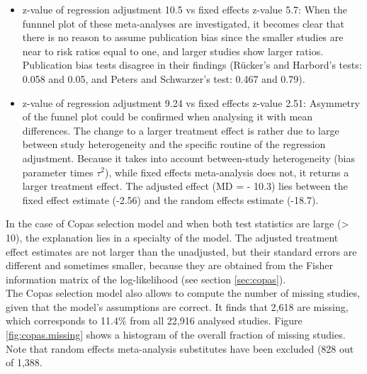 \documentclass[11pt,a4paper,twoside]{book}\usepackage[]{graphicx}\usepackage[]{color}
\begin{document}
\begin{itemize}
\item z-value of regression adjustment 10.5 vs fixed effects z-value 5.7: When the funnnel plot of these meta-analyses are investigated, it becomes clear that there is no reason to assume publication bias since the smaller studies are near to risk ratios equal to one, and larger studies show larger ratios. Publication bias tests disagree in their findings (R\"ucker's and Harbord's tests: 0.058 and 0.05, and Peters and Schwarzer's test: 0.467 and 0.79).
\item z-value of regression adjustment 9.24 vs fixed effects z-value 2.51: Asymmetry of the funnel plot could be confirmed when analysing it with mean differences. The change to a larger treatment effect is rather due to large between study heterogeneity and the specific routine of the regression adjustment. Because it takes into account between-study heterogeneity (bias parameter times $\tau^2$), while fixed effects meta-analysis does not, it returns a larger treatment effect. The adjusted effect (MD = - 10.3) lies between the fixed effect estimate (-2.56) and the random effects estimate (-18.7).
\end{itemize}
In the case of Copas selection model and when both test statistics are large (> 10), the explanation lies in a specialty of the model. The adjusted treatment effect estimates are not larger than the unadjusted, but their standard errors are different and sometimes smaller, because they are obtained from the Fisher information matrix of the log-likelihood (see section \ref{sec:copas}). \\
The Copas selection model also allows to compute the number of missing studies, given that the model's assumptions are correct. It finds that 2,618 are missing, which corresponds to 11.4\% from all 22,916 analysed studies. Figure \ref{fig:copas.missing} shows a histogram of the overall fraction of missing studies. Note that random effects meta-analysis substitutes have been excluded (828 out of 1,388.
\end{document}

